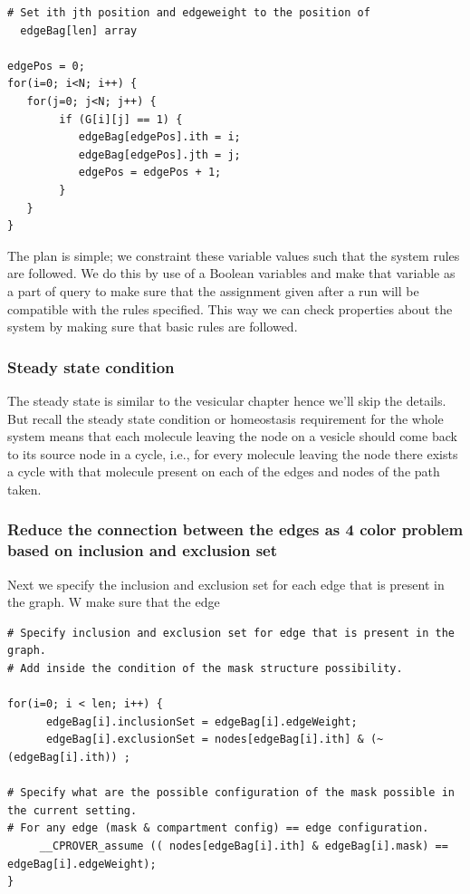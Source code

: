 \documentclass[preprint,12pt]{elsarticle}
\begin{document}
\begin{lstlisting}[mathescape,
  breaklines,
  frame=single,
  caption= \textbf{Necessary condition property.}
]
# Set ith jth position and edgeweight to the position of
  edgeBag[len] array 

edgePos = 0;
for(i=0; i<N; i++) {
   for(j=0; j<N; j++) {
        if (G[i][j] == 1) {
           edgeBag[edgePos].ith = i;
           edgeBag[edgePos].jth = j;
           edgePos = edgePos + 1;
        }
   }
}  
\end{lstlisting}
 
The plan is simple; we constraint these variable values such that the system rules are followed. We do this by use of a Boolean variables and make that variable as a part of query to make sure that the assignment given after a run will be compatible with the rules specified. This way we can check properties about the system by making sure that basic rules are followed.  

\subsubsection{Steady state condition}
The steady state is similar to the vesicular chapter hence we'll skip the details. But recall the steady state condition or homeostasis requirement for the whole system means that each molecule leaving the node on a vesicle should come back to its source node in a cycle, i.e., for every molecule leaving the node there exists a cycle with that molecule present on each of the edges and nodes of the path taken. 

\subsubsection{Reduce the connection between the edges as 4 color problem based on inclusion and exclusion set}
Next we specify the inclusion and exclusion set for each edge that is present in the graph. W make sure that the edge  

\begin{lstlisting}[mathescape,
  breaklines,
  frame=single,
  caption= \textbf{Setting inclusion and exclusion masks.}
]
# Specify inclusion and exclusion set for edge that is present in the graph.
# Add inside the condition of the mask structure possibility.
      
for(i=0; i < len; i++) {
      edgeBag[i].inclusionSet = edgeBag[i].edgeWeight;
      edgeBag[i].exclusionSet = nodes[edgeBag[i].ith] & (~ (edgeBag[i].ith)) ;
      
# Specify what are the possible configuration of the mask possible in the current setting.
# For any edge (mask & compartment config) == edge configuration. 
     __CPROVER_assume (( nodes[edgeBag[i].ith] & edgeBag[i].mask) == edgeBag[i].edgeWeight); 
}
\end{lstlisting}
\end{document}
